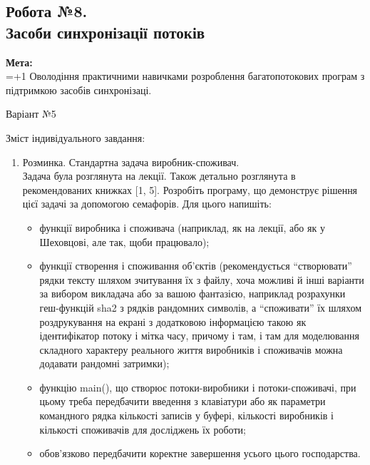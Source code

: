 \documentclass[a4paper,12pt]{article}
\begin{document}
\newpage
    \begin{center}
        \section*{\bfseries{Робота №8.\\
        Засоби синхронізації потоків }}
    \end{center}
    \textbf{Мета:} \\
    \hangindent=1.5cm 
    \hangafter=+1 \noindent
    Оволодіння практичними навичками розроблення багатопотокових програм з підтримкою засобів синхронізаці. \\
    \begin{center}
        \Large{Варіант №5}
    \end{center}
    Зміст індивідуального завдання:
    \begin{enumerate}
        \item Розминка. Стандартна задача виробник-споживач. \\
        Задача була розглянута на лекції. Також детально розглянута в рекомендованих книжках [1, 5]. Розробіть
        програму, що демонструє рішення цієї задачі за допомогою семафорів. Для цього напишіть:
        \begin{itemize}
            \item функції виробника і споживача (наприклад, як на лекції, або як у Шеховцові, але так, щоби працювало);
            \item функції створення і споживання об’єктів (рекомендується “створювати” рядки тексту шляхом зчитування їх з файлу,
            хоча можливі й інші варіанти за вибором викладача або за вашою фантазією, наприклад розрахунки геш-функцій
            sha2 з рядків рандомних символів, а “споживати” їх шляхом роздрукування на екрані з додатковою
            інформацією такою як ідентифікатор потоку і мітка часу, причому і там, і там для моделювання складного
            характеру реального життя виробників і споживачів можна додавати рандомні затримки);
            \item функцію main(), що створює потоки-виробники і потоки-споживачі, при цьому треба передбачити введення з
            клавіатури або як параметри командного рядка кількості записів у буфері, кількості виробників і кількості споживачів для досліджень їх роботи;
            \item обов’язково передбачити коректне завершення усього цього господарства.
        \end{itemize}

\end{enumerate}
\end{document}
